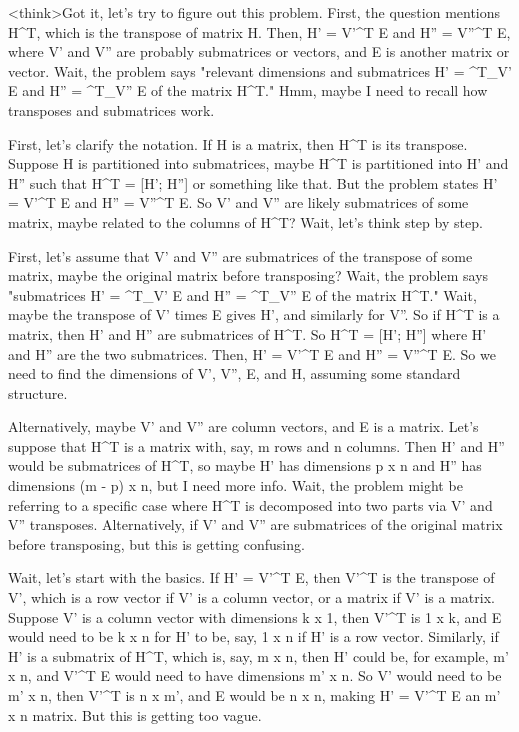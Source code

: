 <think>Got it, let's try to figure out this problem. First, the question mentions H^T, which is the transpose of matrix H. Then, H' = V'^T E and H'' = V''^T E, where V' and V'' are probably submatrices or vectors, and E is another matrix or vector. Wait, the problem says "relevant dimensions and submatrices H' = ^T_V' E and H'' = ^T_V'' E of the matrix H^T." Hmm, maybe I need to recall how transposes and submatrices work.

First, let's clarify the notation. If H is a matrix, then H^T is its transpose. Suppose H is partitioned into submatrices, maybe H^T is partitioned into H' and H'' such that H^T = [H'; H''] or something like that. But the problem states H' = V'^T E and H'' = V''^T E. So V' and V'' are likely submatrices of some matrix, maybe related to the columns of H^T? Wait, let's think step by step.

First, let's assume that V' and V'' are submatrices of the transpose of some matrix, maybe the original matrix before transposing? Wait, the problem says "submatrices H' = ^T_V' E and H'' = ^T_V'' E of the matrix H^T." Wait, maybe the transpose of V' times E gives H', and similarly for V''. So if H^T is a matrix, then H' and H'' are submatrices of H^T. So H^T = [H'; H''] where H' and H'' are the two submatrices. Then, H' = V'^T E and H'' = V''^T E. So we need to find the dimensions of V', V'', E, and H, assuming some standard structure.

Alternatively, maybe V' and V'' are column vectors, and E is a matrix. Let's suppose that H^T is a matrix with, say, m rows and n columns. Then H' and H'' would be submatrices of H^T, so maybe H' has dimensions p x n and H'' has dimensions (m - p) x n, but I need more info. Wait, the problem might be referring to a specific case where H^T is decomposed into two parts via V' and V'' transposes. Alternatively, if V' and V'' are submatrices of the original matrix before transposing, but this is getting confusing.

Wait, let's start with the basics. If H' = V'^T E, then V'^T is the transpose of V', which is a row vector if V' is a column vector, or a matrix if V' is a matrix. Suppose V' is a column vector with dimensions k x 1, then V'^T is 1 x k, and E would need to be k x n for H' to be, say, 1 x n if H' is a row vector. Similarly, if H' is a submatrix of H^T, which is, say, m x n, then H' could be, for example, m' x n, and V'^T E would need to have dimensions m' x n. So V' would need to be m' x n, then V'^T is n x m', and E would be n x n, making H' = V'^T E an m' x n matrix. But this is getting too vague.

